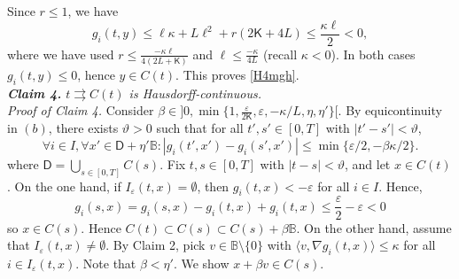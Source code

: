 \documentclass[preprint,12pt]{elsarticle}
\renewcommand{\epsilon}{\varepsilon}
\newcommand{\tto}{\rightrightarrows}
\theoremstyle{plain}
\theoremstyle{definition}
\theoremstyle{remark}
\begin{document}
Since $r\leq 1$, we have 
$$
g_i(t,y)\leq \ell \kappa +L\ell^2+r(2\mathsf{K}+4L)\leq \frac{\kappa \ell}{2}<0,
$$
where we have used $r\leq \frac{-\kappa \ell}{4(2L+\mathsf{K})}$ and $\ell\leq \frac{-\kappa}{4L}$ (recall $\kappa <0$). In both cases $g_i(t,y)\leq 0$, hence $y\in C(t)$. This proves \ref{H4mgh}.\\
  \noindent \emph{{\bf Claim 4.} $t\tto C(t)$ is Hausdorff-continuous.}\\
  \emph{Proof of Claim 4.} Consider $\beta\in ]0,\min\{1,\frac{\epsilon}{2\mathsf{K}},\epsilon,-\kappa/L,\eta,\eta'\}[$. By equicontinuity in $(b)$,  there exists $\vartheta>0$ such that for all $t',s'\in [0,T]$ with $|t'-s'|<\vartheta$, 
  $$
  \forall i\in I, \forall x'\in \mathsf{D}+\eta'\mathbb{B} : |g_i(t',x')-g_i(s',x')|\leq \min\{\epsilon/2,-\beta\kappa/2\}.$$
  where $\mathsf{D} = \bigcup_{s\in [0,T]} C(s)$. Fix $t,s\in [0,T]$ with $|t-s|<\vartheta$, and let $x\in C(t)$. On the one hand, if $I_\epsilon(t,x) = \emptyset$, then $g_i(t,x)<-\epsilon$ for all $i\in I$. Hence, 
  \begin{equation*}
  	g_i(s,x) = g_i(s,x)-g_i(t,x) + g_i(t,x)\leq \frac{\epsilon}{2} - \epsilon <0
  \end{equation*} 
so $x\in C(s)$. Hence $C(t)\subset C(s)\subset C(s)+\beta\mathbb{B}$. On the other hand, assume that $I_\epsilon(t,x)\neq \emptyset$. By Claim 2, pick $v\in \mathbb{B}\setminus \{0\}$ with $\langle v,\nabla g_i(t,x)\rangle\leq \kappa$ for all $i\in I_\epsilon(t,x)$. Note that $\beta<\eta'$. We show $x+\beta v\in C(s)$. \\
\end{document}
